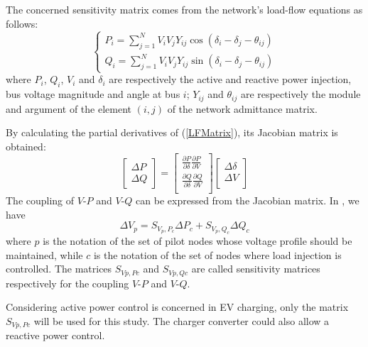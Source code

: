 \documentclass[journal]{IEEEtran}
\begin{document}
The concerned sensitivity matrix comes from the network's load-flow equations as follows:
\begin{equation}
\label{LFMatrix}
\begin{cases}
P_{i}= \displaystyle \sum_{j=1}^{N} V_{i}V_{j}Y_{ij}\cos(\delta_{i}-\delta_{j}-\theta_{ij}) \\
Q_{i}= \displaystyle \sum_{j=1}^{N} V_{i}V_{j}Y_{ij}\sin(\delta_{i}-\delta_{j}-\theta_{ij}) 
\end{cases}
\end{equation}
where $P_{i}$, $Q_{i}$, $V_{i}$ and $\delta_{i}$ are respectively the active and reactive power injection, bus voltage magnitude and angle at bus $i$; $Y_{ij}$ and $\theta_{ij}$ are respectively the module and argument of the element $(i,j)$ of the network admittance matrix.  

By calculating the partial derivatives of (\ref{LFMatrix}), its Jacobian matrix is obtained:
\begin{equation}
\begin{bmatrix}
\Delta P \\
\Delta Q
\end{bmatrix}
=
\displaystyle
\begin{bmatrix}
\frac{\partial P}{\partial \delta} \frac{\partial P}{\partial V} \\
\frac{\partial Q}{\partial \delta} \frac{\partial Q}{\partial V} \\
\end{bmatrix}
\begin{bmatrix}
\Delta \delta \\
\Delta V \\
\end{bmatrix}
\end{equation}
The coupling of $V$-$P$ and $V$-$Q$ can be expressed from the Jacobian matrix. In \cite{He2012}, we have 
\begin{equation}
\Delta V_{p}=S_{V_{p},P_{c}}\Delta P_{c}+S_{V_{p},Q_{c}}\Delta Q_{c}
\end{equation}
where $p$ is the notation of the set of pilot nodes whose voltage profile should be maintained, while $c$ is the notation of the set of nodes where load injection is controlled. The matrices $S_{Vp,Pc}$ and $S_{Vp,Qc}$ are called sensitivity matrices respectively for the coupling $V$-$P$ and $V$-$Q$.

Considering active power control is concerned in EV charging, only the matrix $S_{Vp,Pc}$ will be used for this study. The charger converter could also allow a reactive power control. 
\end{document}
